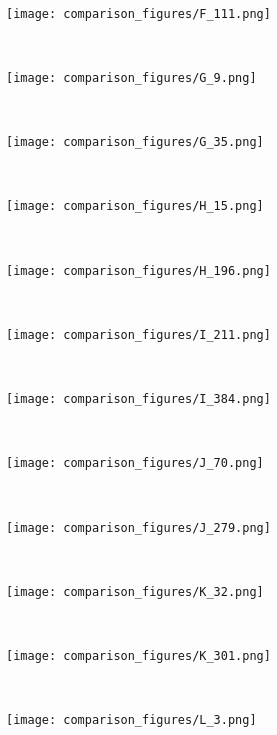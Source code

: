 \documentclass[conference]{IEEEtran}
\begin{document}
\begin{figure*}[!htbp]
    ~
    \begin{subfigure}[b]{0.15\textwidth}
        \texttt{[image: comparison\_figures/F\_111.png]}
    \end{subfigure}
    ~
    \begin{subfigure}[b]{0.15\textwidth}
        \texttt{[image: comparison\_figures/G\_9.png]}
    \end{subfigure}
    ~
    \begin{subfigure}[b]{0.15\textwidth}
        \texttt{[image: comparison\_figures/G\_35.png]}
    \end{subfigure}
    ~
    \begin{subfigure}[b]{0.15\textwidth}
        \texttt{[image: comparison\_figures/H\_15.png]}
    \end{subfigure}
    ~
    \begin{subfigure}[b]{0.15\textwidth}
        \texttt{[image: comparison\_figures/H\_196.png]}
    \end{subfigure}
    ~
    \begin{subfigure}[b]{0.15\textwidth}
        \texttt{[image: comparison\_figures/I\_211.png]}
    \end{subfigure}
    ~
    \begin{subfigure}[b]{0.15\textwidth}
        \texttt{[image: comparison\_figures/I\_384.png]}
    \end{subfigure}
    ~
    \begin{subfigure}[b]{0.15\textwidth}
        \texttt{[image: comparison\_figures/J\_70.png]}
    \end{subfigure}
    ~
    \begin{subfigure}[b]{0.15\textwidth}
        \texttt{[image: comparison\_figures/J\_279.png]}
    \end{subfigure}
    ~
    \begin{subfigure}[b]{0.15\textwidth}
        \texttt{[image: comparison\_figures/K\_32.png]}
    \end{subfigure}
    ~
    \begin{subfigure}[b]{0.15\textwidth}
        \texttt{[image: comparison\_figures/K\_301.png]}
    \end{subfigure}
    ~
    \begin{subfigure}[b]{0.15\textwidth}
        \texttt{[image: comparison\_figures/L\_3.png]}
    \end{subfigure}

\end{figure*}
\end{document}
